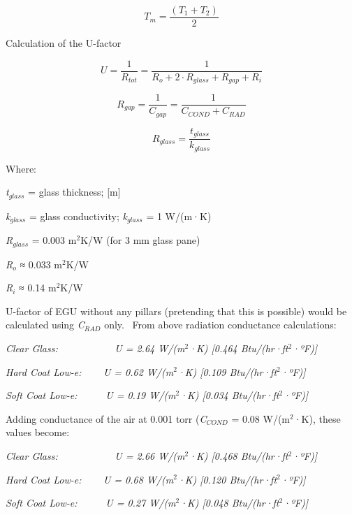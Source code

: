 \begin{equation}
{T_m} = \frac{{\left( {{T_1} + {T_2}} \right)}}{2}
\end{equation}

Calculation of the U-factor

\begin{equation}
U = \frac{1}{{{R_{tot}}}} = \frac{1}{{{R_o} + 2 \cdot {R_{glass}} + {R_{gap}} + {R_i}}}
\end{equation}

\begin{equation}
{R_{gap}} = \frac{1}{{{C_{gap}}}} = \frac{1}{{{C_{COND}} + {C_{RAD}}}}
\end{equation}

\begin{equation}
{R_{glass}} = \frac{{{t_{glass}}}}{{{k_{glass}}}}
\end{equation}

Where:

\emph{t}\(_{glass}\) = glass thickness; {[}m{]}

\emph{k}\(_{glass}\) = glass conductivity; \emph{k}\(_{glass}\) = 1 W/(m·K)

\emph{R}\(_{glass}\) = 0.003 m\(^{2}\)K/W (for 3 mm glass pane)

\emph{R}\(_{o}\) ≈ 0.033 m\(^{2}\)K/W

\emph{R}\(_{i}\) ≈ 0.14 m\(^{2}\)K/W

U-factor of EGU without any pillars (pretending that this is possible) would be calculated using \emph{C}\(_{RAD}\) only.~ From above radiation conductance calculations:

\emph{Clear Glass: ~~~~~~~~~~ U = 2.64 W/(m\(^{2}\)·K) {[}0.464 Btu/(hr·ft\(^{2}\)·ºF){]}}

\emph{Hard Coat Low-e: ~~~ U = 0.62 W/(m\(^{2}\)·K) {[}0.109 Btu/(hr·ft\(^{2}\)·ºF){]}}

\emph{Soft Coat Low-e:~~~~~ U = 0.19 W/(m\(^{2}\)·K) {[}0.034 Btu/(hr·ft\(^{2}\)·ºF){]}}

Adding conductance of the air at 0.001 torr (\emph{C}\(_{COND}\) = 0.08 W/(m\(^{2}\)·K), these values become:

\emph{Clear Glass: ~~~~~~~~~~ U = 2.66 W/(m\(^{2}\)·K) {[}0.468 Btu/(hr·ft\(^{2}\)·ºF){]}}

\emph{Hard Coat Low-e: ~~~ U = 0.68 W/(m\(^{2}\)·K) {[}0.120 Btu/(hr·ft\(^{2}\)·ºF){]}}

\emph{Soft Coat Low-e:~~~~~ U = 0.27 W/(m\(^{2}\)·K) {[}0.048 Btu/(hr·ft\(^{2}\)·ºF){]}}

